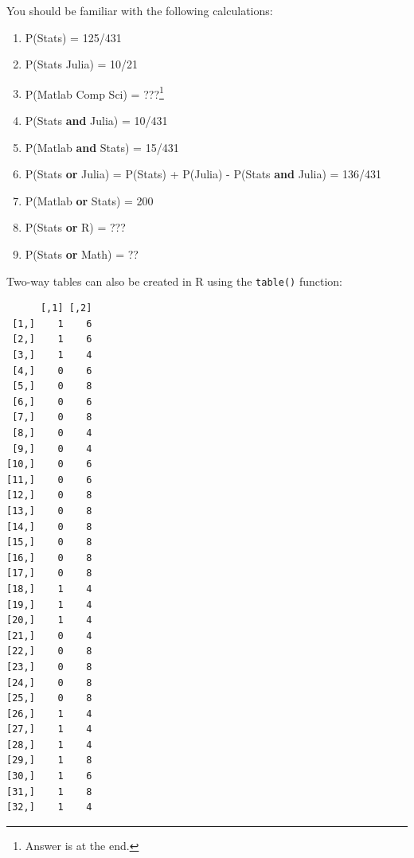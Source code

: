 \documentclass[
  letterpaper,
  DIV=11,
  numbers=noendperiod,
  oneside]{scrreprt}
\newenvironment{Shaded}{\begin{snugshade}}{\end{snugshade}}
\newcommand{\CommentTok}[1]{\textcolor[rgb]{0.37,0.37,0.37}{#1}}
\newcommand{\FunctionTok}[1]{\textcolor[rgb]{0.28,0.35,0.67}{#1}}
\newcommand{\NormalTok}[1]{\textcolor[rgb]{0.00,0.23,0.31}{#1}}
\newcommand{\SpecialCharTok}[1]{\textcolor[rgb]{0.37,0.37,0.37}{#1}}
\providecommand{\tightlist}{%
  \setlength{\itemsep}{0pt}\setlength{\parskip}{0pt}}\usepackage{longtable,booktabs,array}
\begin{document}
You should be familiar with the following calculations:

\begin{enumerate}
\def\labelenumi{\arabic{enumi}.}
\tightlist
\item
  P(Stats) = 125/431
\item
  P(Stats \textbar{} Julia) = 10/21
\item
  P(Matlab \textbar{} Comp Sci) = ???\footnote{Answer is at the end.}
\item
  P(Stats \textbf{and} Julia) = 10/431
\item
  P(Matlab \textbf{and} Stats) = 15/431
\item
  P(Stats \textbf{or} Julia) = P(Stats) + P(Julia) - P(Stats
  \textbf{and} Julia) = 136/431
\item
  P(Matlab \textbf{or} Stats) = 200
\item
  P(Stats \textbf{or} R) = ???
\item
  P(Stats \textbf{or} Math) = ??
\end{enumerate}

Two-way tables can also be created in R using the \texttt{table()}
function:

\begin{Shaded}
\end{Shaded}

\begin{verbatim}
      [,1] [,2]
 [1,]    1    6
 [2,]    1    6
 [3,]    1    4
 [4,]    0    6
 [5,]    0    8
 [6,]    0    6
 [7,]    0    8
 [8,]    0    4
 [9,]    0    4
[10,]    0    6
[11,]    0    6
[12,]    0    8
[13,]    0    8
[14,]    0    8
[15,]    0    8
[16,]    0    8
[17,]    0    8
[18,]    1    4
[19,]    1    4
[20,]    1    4
[21,]    0    4
[22,]    0    8
[23,]    0    8
[24,]    0    8
[25,]    0    8
[26,]    1    4
[27,]    1    4
[28,]    1    4
[29,]    1    8
[30,]    1    6
[31,]    1    8
[32,]    1    4
\end{verbatim}

\begin{Shaded}
\end{Shaded}
\end{document}
